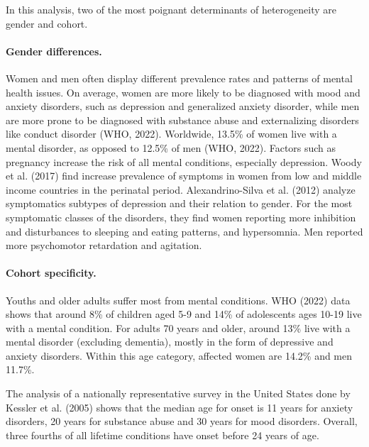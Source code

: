             In this analysis, two of the most poignant determinants of heterogeneity are gender and cohort. 


    \paragraph{Gender differences.}
        Women and men often display different prevalence rates and patterns of mental health issues.
        On average, women are more likely to be diagnosed with mood and anxiety disorders, such as depression and generalized anxiety disorder, while men are more prone to be diagnosed with substance abuse and externalizing disorders like conduct disorder (WHO, 2022). Worldwide, 13.5\% of women live with a mental disorder, as opposed to 12.5\% of men (WHO, 2022). 
        Factors such as pregnancy increase the risk of all mental conditions, especially depression. Woody et al. (2017) find increase prevalence of symptoms in women from low and middle income countries in the perinatal period. 
        Alexandrino-Silva et al. (2012) analyze symptomatics subtypes of depression and their relation to gender. For the most symptomatic classes of the disorders, they find women reporting more inhibition and disturbances to sleeping and eating patterns, and hypersomnia. Men reported more psychomotor retardation and agitation. 


    \paragraph{Cohort specificity.}
    Youths and older adults suffer most from mental conditions. WHO (2022) data shows that around 8\% of children aged 5-9 and 14\% of adolescents ages 10-19 live with a mental condition. For adults 70 years and older, around 13\% live with a mental disorder (excluding dementia), mostly in the form of depressive and anxiety disorders. Within this age category, affected women are 14.2\% and men 11.7\%.

    The analysis of a nationally representative survey in the United States done by Kessler et al. (2005) shows that the median age for onset is 11 years for anxiety disorders, 20 years for substance abuse and 30 years for mood disorders. Overall, three fourths of all lifetime conditions have onset before 24 years of age. 

